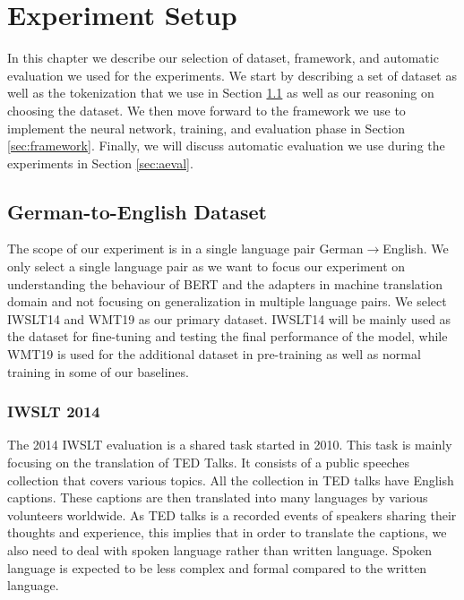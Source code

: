 
\chapter{Experiment Setup}
In this chapter we describe our selection of dataset, framework, and automatic evaluation we used for the experiments. We start by describing a set of dataset as well as the tokenization that we use in Section \ref{sec:dataset} as well as our reasoning on choosing the dataset. We then move forward to the framework we use to implement the neural network, training, and evaluation phase in Section \ref{sec:framework}. Finally, we will discuss automatic evaluation we use during the experiments in Section \ref{sec:aeval}.

\section{German-to-English Dataset}
\label{sec:dataset}
The scope of our experiment is in a single language pair German$\rightarrow$English. We only select a single language pair as we want to focus our experiment on understanding the behaviour of BERT and the adapters in machine translation domain and not focusing on generalization in multiple language pairs. We select IWSLT14 and WMT19 as our primary dataset. IWSLT14 will be mainly used as the dataset for fine-tuning and testing the final performance of the model, while WMT19 is used for the additional dataset in pre-training as well as normal training in some of our baselines.

\subsection{IWSLT 2014}
The 2014 IWSLT evaluation \cite{Cettolo2014ReportOT} is a shared task started in 2010. This task is mainly focusing on the translation of TED Talks. It consists of a public speeches collection that covers various topics. All the collection in TED talks have English captions. These captions are then translated into many languages by various volunteers worldwide. As TED talks is a recorded events of speakers sharing their thoughts and experience, this implies that in order to translate the captions, we also need to deal with spoken language rather than written language. Spoken language is expected to be less complex and formal compared to the written language.

